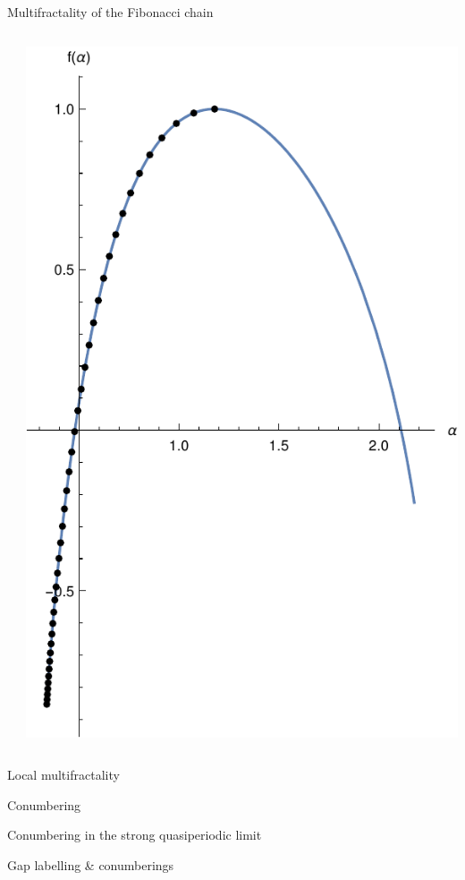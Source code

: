 \documentclass[xcolor=x11names,compress,professionalfonts]{beamer}
\renewcommand{\(}{\begin{columns}}
\renewcommand{\)}{\end{columns}}
\newcommand{\<}[1]{\begin{column}{#1}}
\renewcommand{\>}{\end{column}}
\begin{document}
\begin{frame}{Multifractality of the Fibonacci chain}
\begin{columns}
	\begin{column}{5cm}
		
	\end{column}
	\begin{column}{5cm}
		\centering
		\includegraphics[scale=.5]{falpha05.pdf}
	\end{column}
\end{columns}
\end{frame}

\begin{frame}{Local multifractality}
\end{frame}

\begin{frame}{Conumbering}
\end{frame}

\begin{frame}{Conumbering in the strong quasiperiodic limit}
\end{frame}

\begin{frame}{Gap labelling \& conumberings}
\end{frame}
\end{document}
